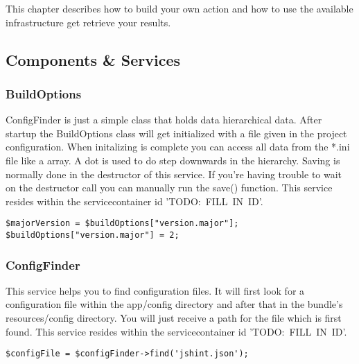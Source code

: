 This chapter describes how to build your own action and how to use the available infrastructure get retrieve your results.

\subsection{Components \& Services}

\noindent
\begin{minipage}{\textwidth}
\vspace{1.5em}
\subsubsection{BuildOptions}
ConfigFinder is just a simple class that holds data hierarchical data. After startup the BuildOptions class will get initialized with a file given in the project configuration. When initalizing is complete you can access all data from the *.ini file like a array. A dot is used to do step downwards in the hierarchy. Saving is normally done in the destructor of this service. If you're having trouble to wait on the destructor call you can manually run the save() function. This service resides within the servicecontainer id \mbox{'TODO: FILL IN ID'}.

\begin{verbatim}
$majorVersion = $buildOptions["version.major"];
$buildOptions["version.major"] = 2;
\end{verbatim}
\end{minipage}
\noindent
\begin{minipage}{\textwidth}
\vspace{1.5em}
\subsubsection{ConfigFinder}
This service helps you to find configuration files. It will first look for a configuration file within the app/config directory and after that in the bundle's resources/config directory. You will just receive a path for the file which is first found. This service resides within the servicecontainer id \mbox{'TODO: FILL IN ID'}.

\begin{verbatim}
$configFile = $configFinder->find('jshint.json');
\end{verbatim}
\end{minipage}

